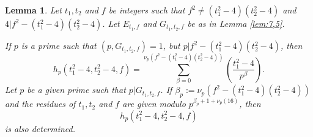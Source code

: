 \documentclass[12pt]{amsart}
\newtheorem{lemma}[theorem]{Lemma}
\theoremstyle{definition}
\numberwithin{equation}{section}
\begin{document}
\begin{lemma}\label{lem:10}Let $t_1,t_2$ and $f$ be
integers such that $f^2\neq\left(t_1^2-4\right)\left(t_2^2-4\right
)$ and
$4|f^2-\left(t_1^2-4\right)\left(t_2^2-4\right)$. Let $E_{t_1,f}$ and $
G_{t_1,t_2,f}$ be as in
Lemma \ref{lem:7,5}.

If $p$ is a prime such that $\left(p,G_{t_1,t_2,f}\right)=1$, but
$p|f^2-\left(t_1^2-4\right)\left(t_2^2-4\right)$, then
\begin{equation}h_p\left(t_1^2-4,t_2^2-4,f\right)=\sum_{\beta =0}^{
\nu_p\left(f^2-\left(t_1^2-4\right)\left(t_2^2-4\right)\right)}\left
(\frac {t_1^2-4}{p^{\beta}}\right).\label{200}\end{equation}
Let $p$ be a given prime such that $p|G_{t_1,t_2,f}$. If $\beta_p
:=\nu_p\left(f^2-\left(t_1^2-4\right)\left(t_2^2-4\right)\right)$ and the residues of $
t_1,t_2$ and $f$ are given modulo
$p^{\beta_p+1+\nu_p\left(16\right)}$, then
\[h_p\left(t_1^2-4,t_2^2-4,f\right)\]
 is also determined.
\end{lemma}
\end{document}
